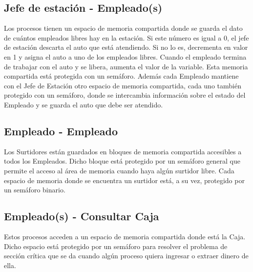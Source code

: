 \documentclass{article}
\begin{document}
\subsection{Jefe de estación - Empleado(s)}
Los procesos tienen un espacio de memoria compartida donde se guarda el dato de cuántos empleados libres hay en la estación. Si este número es igual a 0, el jefe de estación descarta el auto que está atendiendo. Si no lo es, decrementa en valor en 1 y asigna el auto a uno de los empleados libres. Cuando el empleado termina de trabajar con el auto y se libera, aumenta el valor de la variable. Esta memoria compartida está protegida con un semáforo.
Además cada Empleado mantiene con el Jefe de Estación otro espacio de memoria compartida, cada uno también protegido con un semáforo, donde se intercambia información sobre el estado del Empleado y se guarda el auto que debe ser atendido.
\subsection{Empleado - Empleado}
Los Surtidores están guardados en bloques de memoria compartida accesibles a todos los Empleados. Dicho bloque está protegido por un semáforo general que permite el acceso al área de memoria cuando haya algún surtidor libre. Cada espacio de memoria donde se encuentra un surtidor está, a su vez, protegido por un semáforo binario.
\subsection{Empleado(s) - Consultar Caja}
Estos procesos acceden a un espacio de memoria compartida donde está la Caja. Dicho espacio está protegido por un semáforo para resolver el problema de sección crítica que se da cuando algún proceso quiera ingresar o extraer dinero de ella.
\end{document}
